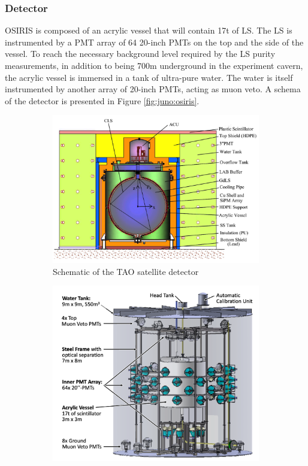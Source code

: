 \documentclass[../main.tex]{subfiles}
\begin{document}
\subsubsection{Detector}
OSIRIS is composed of an acrylic vessel that will contain 17t of LS. The LS is instrumented by a PMT array of 64 20-inch PMTs on the top and the side of the vessel. To reach the necessary background level required by the LS purity measurements, in addition to being 700m underground in the experiment cavern, the acrylic vessel is immersed in a tank of ultra-pure water. The water is itself instrumented by another array of 20-inch PMTs, acting as muon veto. A schema of the detector is presented in Figure \ref{fig:juno:osiris}.

\begin{figure}[ht]
  \centering
  \begin{subfigure}[t]{0.49\linewidth}
    \includegraphics[width=\linewidth]{images/juno/tao_schematic.png}
    \caption{Schematic of the TAO satellite detector}
    \label{fig:juno:tao}
  \end{subfigure}
  \hfill
  \begin{subfigure}[t]{0.49\linewidth}
    \includegraphics[width=\linewidth]{images/juno/osiris_schematic.png}

\end{subfigure}
\end{figure}
\end{document}
